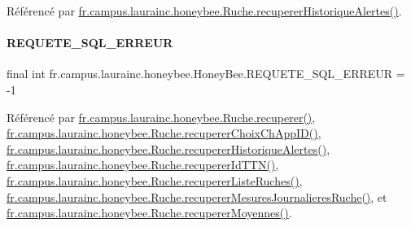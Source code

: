 Référencé par \hyperlink{classfr_1_1campus_1_1laurainc_1_1honeybee_1_1_ruche_ace10a52a470257f2b8f161fc3c7b9f15}{fr.\+campus.\+laurainc.\+honeybee.\+Ruche.\+recuperer\+Historique\+Alertes()}.

\mbox{\label{classfr_1_1campus_1_1laurainc_1_1honeybee_1_1_honey_bee_a275b7a8582c8193ff444d21928ef7e36}} 
\paragraph{\texorpdfstring{R\+E\+Q\+U\+E\+T\+E\+\_\+\+S\+Q\+L\+\_\+\+E\+R\+R\+E\+UR}{REQUETE\_SQL\_ERREUR}}
{\footnotesize\ttfamily final int fr.\+campus.\+laurainc.\+honeybee.\+Honey\+Bee.\+R\+E\+Q\+U\+E\+T\+E\+\_\+\+S\+Q\+L\+\_\+\+E\+R\+R\+E\+UR = -\/1\hspace{0.3cm}{\ttfamily [static]}}



Référencé par \hyperlink{classfr_1_1campus_1_1laurainc_1_1honeybee_1_1_ruche_a7a99d3c585f2c507eb2c6c265a5bb1fe}{fr.\+campus.\+laurainc.\+honeybee.\+Ruche.\+recuperer()}, \hyperlink{classfr_1_1campus_1_1laurainc_1_1honeybee_1_1_ruche_ade5d681bd0a29d84e0d069169b10a38b}{fr.\+campus.\+laurainc.\+honeybee.\+Ruche.\+recuperer\+Choix\+Ch\+App\+I\+D()}, \hyperlink{classfr_1_1campus_1_1laurainc_1_1honeybee_1_1_ruche_ace10a52a470257f2b8f161fc3c7b9f15}{fr.\+campus.\+laurainc.\+honeybee.\+Ruche.\+recuperer\+Historique\+Alertes()}, \hyperlink{classfr_1_1campus_1_1laurainc_1_1honeybee_1_1_ruche_a1113f3b4a527a801fdf50350667fd212}{fr.\+campus.\+laurainc.\+honeybee.\+Ruche.\+recuperer\+Id\+T\+T\+N()}, \hyperlink{classfr_1_1campus_1_1laurainc_1_1honeybee_1_1_ruche_aba0591cda391b907da41a0afeba4d59d}{fr.\+campus.\+laurainc.\+honeybee.\+Ruche.\+recuperer\+Liste\+Ruches()}, \hyperlink{classfr_1_1campus_1_1laurainc_1_1honeybee_1_1_ruche_a84de3c3af21b1cbeae2075e480acaabc}{fr.\+campus.\+laurainc.\+honeybee.\+Ruche.\+recuperer\+Mesures\+Journalieres\+Ruche()}, et \hyperlink{classfr_1_1campus_1_1laurainc_1_1honeybee_1_1_ruche_a94f815b44f0d5d8682833d6b6e783713}{fr.\+campus.\+laurainc.\+honeybee.\+Ruche.\+recuperer\+Moyennes()}.

